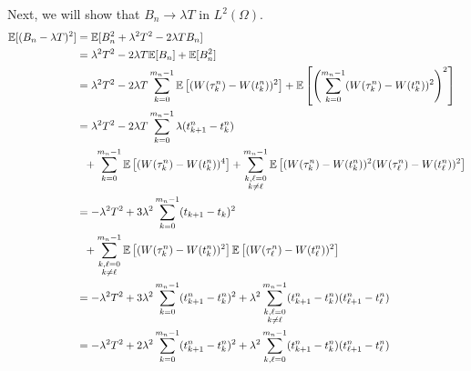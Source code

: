 \begin{solution}
  Next, we will show that $B_n\to \lambda T$ in $L^2(\Omega)$.
  \begin{align*}
    \EE[(B_n-\lambda T)^2]
     & = \EE[B_n^2+\lambda^2 T^2 - 2\lambda T B_n]                                                                                                                                            \\
     & = \lambda^2 T^2 - 2\lambda T \EE[ B_n] + \EE[B_n^2]                                                                                                                                    \\
     & = \lambda^2 T^2 - 2\lambda T \sum\limits_{k=0}^{m_n-1} \EE\left[(W(\tau_k^n) - W(t_k^n))^2\right] + \EE\left[\left(\sum\limits_{k=0}^{m_n-1}(W(\tau_k^n) - W(t_k^n))^2\right)^2\right] \\
     & = \lambda^2 T^2 - 2\lambda T \sum\limits_{k=0}^{m_n-1} \lambda (t_{k+1}^n-t_k^n)                                                                                                       \\
     & \,\,\,\, + \sum\limits_{k=0}^{m_n-1}\EE\left[(W(\tau_k^n) - W(t_k^n))^4\right] + \sum\limits_{\substack{k,\ell=0                                                                       \\ k\ne \ell}}^{m_n-1} \EE\left[(W(\tau_k^n) - W(t_k^n))^2(W(\tau_\ell^n) - W(t_\ell^n))^2\right]                                                                                                    \\
     & = -\lambda^2 T^2 + 3\lambda^2\sum\limits_{k=0}^{m_n-1}(t_{k+1}-t_k)^2                                                                                                                  \\
     & \,\,\,\,+ \sum\limits_{\substack{k,\ell=0                                                                                                                                              \\ k\ne \ell}}^{m_n-1} \EE\left[(W(\tau_k^n) - W(t_k^n))^2\right] \EE\left[(W(\tau_\ell^n) - W(t_\ell^n))^2\right] \\
     & = -\lambda^2 T^2 + 3\lambda^2\sum\limits_{k=0}^{m_n-1}(t_{k+1}^n-t_k^n)^2 + \lambda^2\sum\limits_{\substack{k,\ell=0                                                                   \\ k\ne \ell}}^{m_n-1} (t_{k+1}^n-t_k^n)(t_{\ell+1}^n-t_\ell^n) \\
     & = -\lambda^2 T^2 + 2\lambda^2\sum\limits_{k=0}^{m_n-1}(t_{k+1}^n-t_k^n)^2 + \lambda^2\sum\limits_{\substack{k,\ell=0}}^{m_n-1} (t_{k+1}^n-t_k^n)(t_{\ell+1}^n-t_\ell^n)                \\

\end{align*}
\end{solution}

